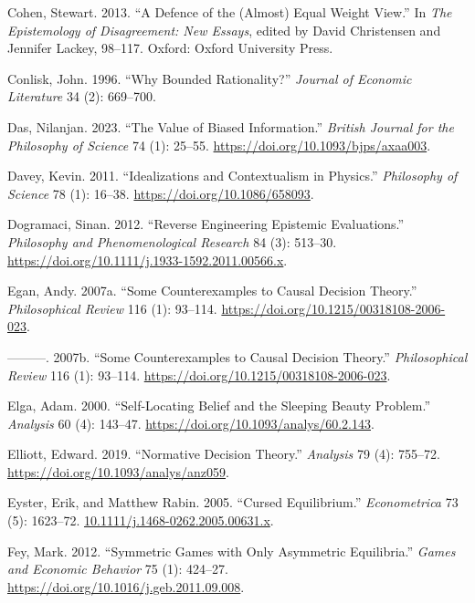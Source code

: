 \documentclass[
  12pt,
  letterpaper,
  DIV=11,
  numbers=noendperiod]{scrreprt}
\newlength{\cslhangindent}
\newenvironment{CSLReferences}[2] %
 {\begin{list}{}{%
  \setlength{\itemindent}{0pt}
  \setlength{\leftmargin}{0pt}
  \setlength{\parsep}{0pt}
  \ifodd #1
   \setlength{\leftmargin}{\cslhangindent}
   \setlength{\itemindent}{-1\cslhangindent}
  \fi
  \setlength{\itemsep}{#2\baselineskip}}}
 {\end{list}}
\begin{document}
\begin{CSLReferences}{1}{0}
Cohen, Stewart. 2013. {``A Defence of the (Almost) Equal Weight View.''}
In \emph{The Epistemology of Disagreement: New Essays}, edited by David
Christensen and Jennifer Lackey, 98--117. Oxford: Oxford University
Press.

Conlisk, John. 1996. {``Why Bounded Rationality?''} \emph{Journal of
Economic Literature} 34 (2): 669--700.

Das, Nilanjan. 2023. {``The Value of Biased Information.''}
\emph{British Journal for the Philosophy of Science} 74 (1): 25--55.
\url{https://doi.org/10.1093/bjps/axaa003}.

Davey, Kevin. 2011. {``Idealizations and Contextualism in Physics.''}
\emph{Philosophy of Science} 78 (1): 16--38.
\url{https://doi.org/10.1086/658093}.

Dogramaci, Sinan. 2012. {``Reverse Engineering Epistemic Evaluations.''}
\emph{Philosophy and Phenomenological Research} 84 (3): 513--30.
\url{https://doi.org/10.1111/j.1933-1592.2011.00566.x}.

Egan, Andy. 2007a. {``Some Counterexamples to Causal Decision Theory.''}
\emph{Philosophical Review} 116 (1): 93--114.
\url{https://doi.org/10.1215/00318108-2006-023}.

---------. 2007b. {``{Some Counterexamples to Causal Decision
Theory}.''} \emph{Philosophical Review} 116 (1): 93--114.
\url{https://doi.org/10.1215/00318108-2006-023}.

Elga, Adam. 2000. {``Self-Locating Belief and the Sleeping Beauty
Problem.''} \emph{Analysis} 60 (4): 143--47.
\url{https://doi.org/10.1093/analys/60.2.143}.

Elliott, Edward. 2019. {``Normative Decision Theory.''} \emph{Analysis}
79 (4): 755--72. \url{https://doi.org/10.1093/analys/anz059}.

Eyster, Erik, and Matthew Rabin. 2005. {``Cursed Equilibrium.''}
\emph{Econometrica} 73 (5): 1623--72.
\href{https://10.1111/j.1468-0262.2005.00631.x}{10.1111/j.1468-0262.2005.00631.x}.

Fey, Mark. 2012. {``Symmetric Games with Only Asymmetric Equilibria.''}
\emph{Games and Economic Behavior} 75 (1): 424--27.
\url{https://doi.org/10.1016/j.geb.2011.09.008}.


\end{CSLReferences}
\end{document}
